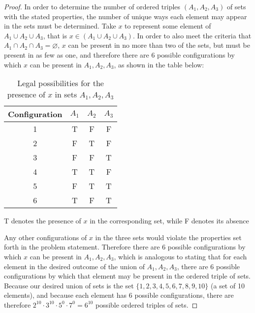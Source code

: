 \documentclass[12pt]{article}
\begin{document}
\begin{proof}
In order to determine the number of ordered triples $(A_1,A_2,A_3)$ of sets with the stated properties, the number of unique ways each element may appear in the sets must be determined. Take $x$ to represent some element of $A_1 \cup A_2 \cup A_3$, that is $x \in (A_1 \cup A_2 \cup A_3)$. In order to also meet the criteria that $A_1 \cap A_2 \cap A_3 = \varnothing$, $x$ can be present in no more than two of the sets, but must be present in as few as one, and therefore there are 6 possible configurations by which $x$ can be present in $A_1,A_2,A_3$, as shown in the table below:

\begin{table}[ht]
\caption{Legal possibilities for the presence of $x$ in sets $A_1,A_2,A_3$} %
\centering                                          %
\begin{tabular}{c c c c}                              %
\hline\hline                                        %
Configuration & $A_1$ & $A_2$ & $A_3$ \\ [0.5ex] %
\hline                                             %
1 & T & F & F \\                              %
2 & F & T & F \\
3 & F & F & T \\
4 & T & T & F \\
5 & F & T & T \\
6 & T & F & T \\ [1ex]                        %
\hline                                             %
\end{tabular}
\begin{tablenotes}
\centering
\small 
\item T denotes the presence of $x$ in the corresponding set, while F denotes its absence
\end{tablenotes}
\label{table:xpos}                               %
\end{table}
Any other configurations of $x$ in the three sets would violate the properties set forth in the problem statement. Therefore there are 6 possible configurations by which $x$ can be present in $A_1,A_2,A_3$, which is analogous to stating that for each element in the desired outcome of the union of $A_1,A_2,A_3$, there are 6 possible configurations by which that element may be present in the ordered triple of sets. Because our desired union of sets is the set $\{1,2,3,4,5,6,7,8,9,10\}$ (a set of 10 elements), and because each element has 6 possible configurations, there are therefore $2^{10} \cdot 3^{10} \cdot 5^0 \cdot 7^0 = 6^{10}$ possible ordered triples of sets.
\end{proof}
\end{document}

